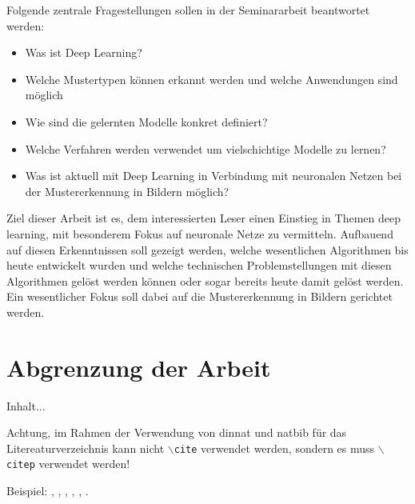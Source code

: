Folgende zentrale Fragestellungen sollen in der Seminararbeit beantwortet werden:
\begin{itemize}
\item Was ist Deep Learning?
\item Welche Mustertypen können erkannt werden und welche Anwendungen sind möglich
\item Wie sind die gelernten Modelle konkret definiert?
\item Welche Verfahren werden verwendet um vielschichtige Modelle zu lernen?
\item Was ist aktuell mit Deep Learning in Verbindung mit neuronalen Netzen bei der Mustererkennung in Bildern möglich?
\end{itemize}

Ziel dieser Arbeit ist es, dem interessierten Leser einen Einstieg in Themen deep learning, mit besonderem Fokus auf neuronale Netze zu vermitteln. Aufbauend auf diesen Erkenntnissen soll gezeigt werden, welche wesentlichen Algorithmen bis heute entwickelt wurden und welche technischen Problemstellungen mit diesen Algorithmen gelöst werden können oder sogar bereits heute damit gelöst werden. Ein wesentlicher Fokus soll dabei auf die Mustererkennung in Bildern gerichtet werden.

\section{Abgrenzung der Arbeit}
Inhalt...

Achtung, im Rahmen der Verwendung von dinnat und natbib für das Litereaturverzeichnis kann nicht \texttt{$\backslash$cite} verwendet werden, sondern es muss \texttt{$\backslash$citep} verwendet werden!

Beispiel: \citep{Blank2008}, \citep{DeutscheNationalBibliothek2009}, \citep{Ehgartner2004}, \citep{Farkas2007}, \citep{Hatcher2004}, \citep{Henze2006}.
